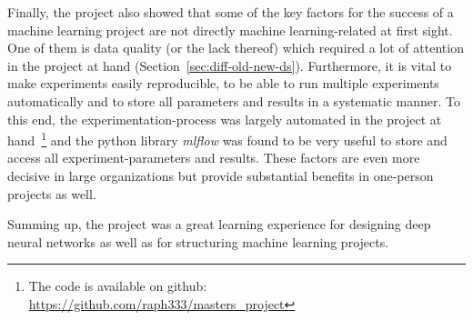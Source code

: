 Finally, the project also showed that some of the key factors for the success of a machine learning project are not directly machine learning-related at first sight. One of them is data quality (or the lack thereof) which required a lot of attention in the project at hand (Section~\ref{sec:diff-old-new-ds}). Furthermore, it is vital to make experiments easily reproducible, to be able to run multiple experiments automatically and to store all parameters and results in a systematic manner. To this end, the experimentation-process was largely automated in the project at hand~\footnote{The code is available on github: \url{https://github.com/raph333/masters_project}} and the python library \textit{mlflow} was found to be very useful to store and access all experiment-parameters and results. These factors are even more decisive in large organizations but provide substantial benefits in one-person projects as well.

Summing up, the project was a great learning experience for designing deep neural networks as well as for structuring machine learning projects.